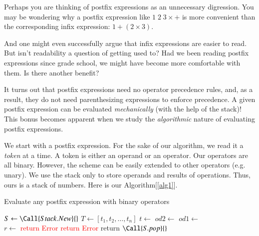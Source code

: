 \documentclass{resonance}
\begin{document}
Perhaps you are thinking of postfix expressions as an unnecessary digression. You may be wondering why a postfix expression like $1\;2\;3\times +$ is more convenient than the corresponding infix expression: $1+(2\times 3)$.

And one might even successfully argue that infix expressions are easier to read. But isn't readability a question of getting used to? Had we been reading postfix expressions since grade school, we might have become more comfortable with them. Is there another benefit? 

It turns out that postfix expressions need no operator precedence rules, and, as a result, they do not need parenthesizing expressions to enforce precedence. A given postfix expression can be evaluated \emph{mechanically} (with the help of the stack)! This bonus becomes apparent when we study the \emph{algorithmic} nature of evaluating postfix expressions. 

We start with a postfix expression. For the sake of our algorithm, we read it a \emph{token} at a time. A token is either an operand or an operator. Our operators are all binary. However, the scheme can be easily extended to other operators (e.g. unary). We use the stack only to store operands and results of operations. Thus, ours is a stack of numbers. Here is our Algorithm[\ref{alg1}].
\begin{algorithm}
\caption{Evaluate any postfix expression with binary operators}
\label{alg1}
\begin{algorithmic}[1]
  \State $S \gets \Call{Stack.New}{}$
  \State $T \gets [t_1, t_2, \dots,t_n]$
	 
	  \State $t \gets$
			\State {} \Comment{\textcolor{red}{Return Error if the stack is full}}
		 
			\State $od2 \gets$  
			\State $od1 \gets$  
			\\
			\Comment{\textcolor{red}{Return Error: not enough operands on the stack}}
			\State $r \gets$  
			\State {}\Comment{\textcolor{red}{Return Error if the stack is full}}
		\Else 
		  \State \textcolor{red}{return Error} 
		\EndIf
	\EndWhile
	  \State \textcolor{red}{return Error} 
	\Else 
	  \State return $\Call{S.pop}{ }$ 
	\EndIf
\end{algorithmic}
\end{algorithm}
\end{document}
